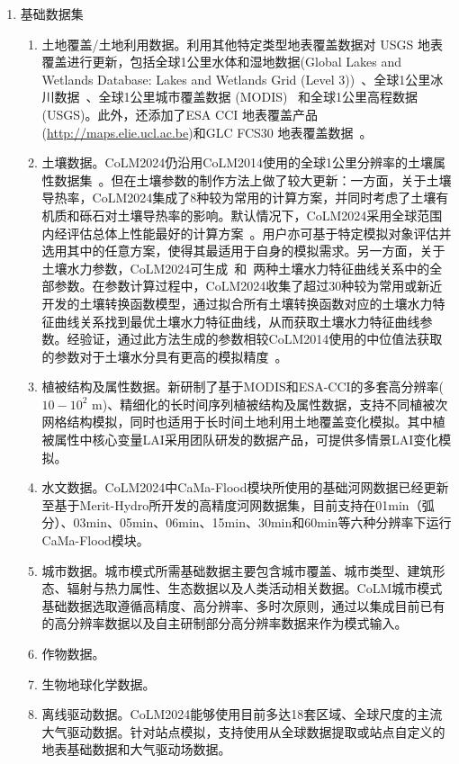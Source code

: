 \begin{enumerate}[label={\arabic*)}]
    \item 基础数据集
    \begin{enumerate}[label={\alph*)}]
        \item 土地覆盖/土地利用数据。利用其他特定类型地表覆盖数据对 USGS 地表覆盖进行更新，包括全球1公里水体和湿地数据(Global Lakes and Wetlands Database: Lakes and Wetlands Grid (Level 3))~\citep{lehner2004development}、全球1公里冰川数据~\citep{RGIConsortium2017}、全球1公里城市覆盖数据 (MODIS)~\citep{schneider2009new} 和全球1公里高程数据(USGS)。此外，还添加了ESA CCI 地表覆盖产品(\url{http://maps.elie.ucl.ac.be})和GLC FCS30 地表覆盖数据~\citep{zhang2023glc_fcs30d}。
        \item 土壤数据。CoLM2024仍沿用CoLM2014使用的全球1公里分辨率的土壤属性数据集~\citep{shangguan2014global}。但在土壤参数的制作方法上做了较大更新：一方面，关于土壤导热率，CoLM2024集成了8种较为常用的计算方案，并同时考虑了土壤有机质和砾石对土壤导热率的影响。默认情况下，CoLM2024采用全球范围内经评估总体上性能最好的计算方案~\citep{dai2019evaluation, balland2005}。用户亦可基于特定模拟对象评估并选用其中的任意方案，使得其最适用于自身的模拟需求。另一方面，关于土壤水力参数，CoLM2024可生成~\citet{campbell1974}和~\citet{van1980closed}两种土壤水力特征曲线关系中的全部参数。在参数计算过程中，CoLM2024收集了超过30种较为常用或新近开发的土壤转换函数模型，通过拟合所有土壤转换函数对应的土壤水力特征曲线关系找到最优土壤水力特征曲线，从而获取土壤水力特征曲线参数。经验证，通过此方法生成的参数相较CoLM2014使用的中位值法获取的参数对于土壤水分具有更高的模拟精度~\citep{dai2019parameters}。
        \item 植被结构及属性数据。新研制了基于MODIS和ESA-CCI的多套高分辨率($10-10^2$ m)、精细化的长时间序列植被结构及属性数据，支持不同植被次网格结构模拟，同时也适用于长时间土地利用土地覆盖变化模拟。其中植被属性中核心变量LAI采用团队研发的数据产品\citep{yuan2011reprocessing,lin2023ReprocessedMODISVersion}，可提供多情景LAI变化模拟。
        \item 水文数据。CoLM2024中CaMa-Flood模块所使用的基础河网数据已经更新至基于Merit-Hydro所开发的高精度河网数据集，目前支持在01min（弧分）、03min、05min、06min、15min、30min和60min等六种分辨率下运行CaMa-Flood模块。
        \item 城市数据。城市模式所需基础数据主要包含城市覆盖、城市类型、建筑形态、辐射与热力属性、生态数据以及人类活动相关数据。CoLM城市模式基础数据选取遵循高精度、高分辨率、多时次原则，通过以集成目前已有的高分辨率数据以及自主研制部分高分辨率数据来作为模式输入。
        \item 作物数据。
        \item 生物地球化学数据。
        \item 离线驱动数据。CoLM2024能够使用目前多达18套区域、全球尺度的主流大气驱动数据。针对站点模拟，支持使用从全球数据提取或站点自定义的地表基础数据和大气驱动场数据。
    \end{enumerate}
    

\end{enumerate}
